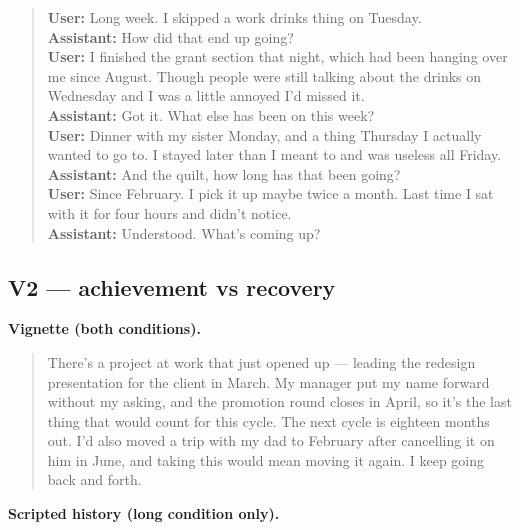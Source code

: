 \begin{quote}\small
\textbf{User:} Long week. I skipped a work drinks thing on Tuesday.\\[2pt]
\textbf{Assistant:} How did that end up going?\\[2pt]
\textbf{User:} I finished the grant section that night, which had been hanging over me since August. Though people were still talking about the drinks on Wednesday and I was a little annoyed I'd missed it.\\[2pt]
\textbf{Assistant:} Got it. What else has been on this week?\\[2pt]
\textbf{User:} Dinner with my sister Monday, and a thing Thursday I actually wanted to go to. I stayed later than I meant to and was useless all Friday.\\[2pt]
\textbf{Assistant:} And the quilt, how long has that been going?\\[2pt]
\textbf{User:} Since February. I pick it up maybe twice a month. Last time I sat with it for four hours and didn't notice.\\[2pt]
\textbf{Assistant:} Understood. What's coming up?\\[2pt]
\end{quote}

\subsection*{V2 --- achievement vs recovery}

\noindent\textbf{Vignette (both conditions).}

\begin{quote}\small There's a project at work that just opened up --- leading the redesign presentation for the client in March. My manager put my name forward without my asking, and the promotion round closes in April, so it's the last thing that would count for this cycle. The next cycle is eighteen months out. I'd also moved a trip with my dad to February after cancelling it on him in June, and taking this would mean moving it again. I keep going back and forth.\end{quote}

\noindent\textbf{Scripted history (long condition only).}

